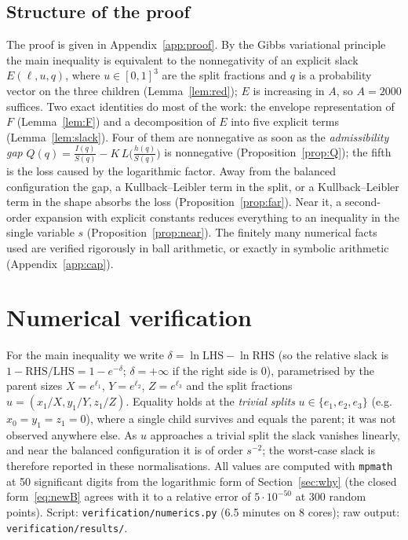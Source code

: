 \documentclass[11pt]{article}
\theoremstyle{definition}
\numberwithin{equation}{section}
\newcommand{\Azero}{2000}
\begin{document}
\subsection{Structure of the proof}\label{sec:structure}
The proof is given in Appendix~\ref{app:proof}. By the Gibbs variational principle the main inequality is
equivalent to the nonnegativity of an explicit slack $E(\ell,u,q)$, where $u\in[0,1]^3$ are the split fractions and $q$ is a
probability vector on the three children (Lemma~\ref{lem:red}); $E$ is increasing in $A$, so $A=\Azero$ suffices. Two exact
identities do most of the work: the envelope representation of $F$ (Lemma~\ref{lem:F}) and a decomposition of $E$ into five
explicit terms (Lemma~\ref{lem:slack}). Four of them are nonnegative as soon as the \emph{admissibility gap}
$Q(q)=\frac{I(q)}{S(q)}-K\,L\bigl(\frac{h(q)}{S(q)}\bigr)$ is nonnegative (Proposition~\ref{prop:Q}); the fifth is the loss
caused by the logarithmic factor. Away from the balanced configuration the gap, a Kullback--Leibler term in the split, or a
Kullback--Leibler term in the shape absorbs the loss (Proposition~\ref{prop:far}). Near it, a second-order expansion with explicit
constants reduces everything to an inequality in the single variable $s$ (Proposition~\ref{prop:near}). The finitely many
numerical facts used are verified rigorously in ball arithmetic, or exactly in symbolic arithmetic (Appendix~\ref{app:cap}).

\section{Numerical verification}\label{sec:num}
For the main inequality we write $\delta=\ln\mathrm{LHS}-\ln\mathrm{RHS}$ (so the relative slack is
$1-\mathrm{RHS}/\mathrm{LHS}=1-e^{-\delta}$; $\delta=+\infty$ if the right side is $0$), parametrised by the parent sizes
$X=e^{\ell_1}$, $Y=e^{\ell_2}$, $Z=e^{\ell_3}$ and the split fractions $u=(x_1/X,y_1/Y,z_1/Z)$. Equality holds at the
\emph{trivial splits} $u\in\{e_1,e_2,e_3\}$ (e.g.\ $x_0=y_1=z_1=0$), where a single child survives and equals the parent;
it was not observed anywhere else. As $u$
approaches a trivial split the slack vanishes linearly, and near the balanced configuration it is of order $s^{-2}$; the worst-case
slack is therefore reported in these normalisations. All values are computed with \texttt{mpmath} at 50 significant digits from
the logarithmic form of Section~\ref{sec:why} (the closed form~\eqref{eq:newB} agrees with it to a relative error of
$5\cdot10^{-50}$ at 300 random points). Script: \texttt{verification/numerics.py} (6.5 minutes on 8 cores); raw output:
\texttt{verification/results/}.
\end{document}
